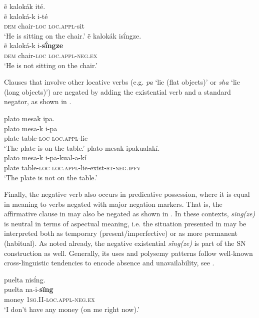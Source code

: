 \documentclass[output=paper,colorlinks,citecolor=brown]{langscibook}
\begin{document}
\ea\label{ex:kog:49}
    \ea\label{ex:kog:49a}ẽ kalokák ité.\\
        \gll  ẽ kaloká-k i-té\\ 
              \textsc{dem} chair-\textsc{loc} \textsc{loc.appl-}sit \\
        \glt ‘He is sitting on the chair.’
    \ex\label{ex:kog:49b}ẽ kalokák isḯngze.\\
        \gll  ẽ kaloká-k i-\textbf{sḯngze}\\
              \textsc{dem} chair-\textsc{loc} \textsc{loc.appl-}\textsc{neg.ex} \\
        \glt ‘He is not sitting on the chair.’
    \z
\z 

Clauses that involve other locative verbs (e.g. \textit{pa} ‘lie (flat objects)’ or \textit{sha} ‘lie (long objects)’) are negated by adding the existential verb and a standard negator, as shown in .

\ea\label{ex:kog:50}
    \ea\label{ex:kog:50a} plato mesak ipa.\\
        \gll  plato mesa-k i-pa\\ 
              plate table-\textsc{loc} \textsc{loc.appl-}lie\\
        \glt ‘The plate is on the table.’
    \ex\label{ex:kog:50b}plato mesak ipakualakí.\\
        \gll  plato mesa-k i-pa{}-kual-a-kí\\
              plate table-\textsc{loc} \textsc{loc.appl-}lie\textit{{}-}exist-\textsc{st-neg.ipfv}\\
        \glt ‘The plate is not on the table.’
    \z
\z 

Finally, the negative verb also occurs in predicative possession, where it is equal in meaning to verbs negated with major negation markers. That is, the affirmative clause in  may also be negated as shown in . In these contexts, \textit{sïng(ze)} is neutral in terms of aspectual meaning, i.e. the situation presented in  may be interpreted both as temporary (present/imperfective) or as more permanent (habitual). As noted already, the negative existential \textit{sïng(ze)} is part of the SN construction as well. Generally, its uses and polysemy patterns follow well-known cross-linguistic tendencies to encode absence and unavailability, see \citet{Veselinova2013neg.exist}.

\ea\label{ex:kog:51} puelta nisḯng.\\
    \gll  puelta na-i-\textbf{sïng}\\ 
          money \textsc{1sg.II{}-loc.appl-neg.ex}\\
    \glt ‘I don't have any money (on me right now).’
\z 
\end{document}
